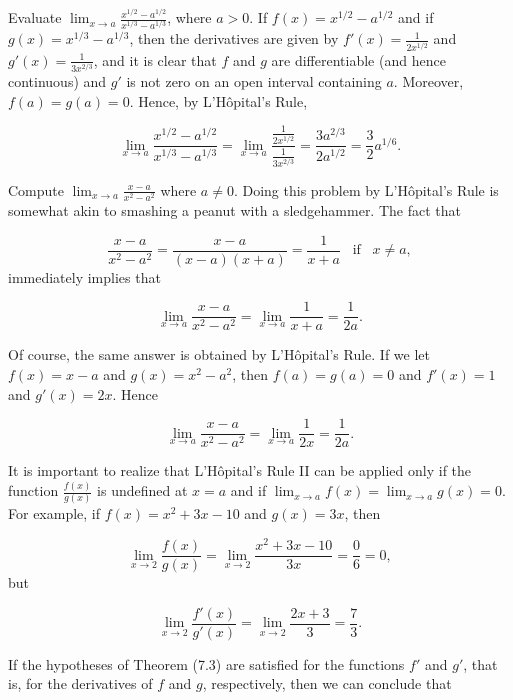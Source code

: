 \begin{example}
Evaluate $\lim_{x \rightarrow a}\frac{x^{1/2} - a^{1/2}}{x^{1/3} - a^{1/3}}$, where $a > 0$. If $f(x) = x^{1/2} - a^{1/2}$ and if $g(x) = x^{1/3} - a^{1/3}$, then the derivatives are given by $f' (x) = \frac{1}{2x^{1/2}}$ and $g'(x) = \frac{1}{3x^{2/3}}$, and it is clear that $f$ and $g$ are differentiable (and hence continuous) and $g'$ is not zero on an open interval containing $a$.  Moreover,
$f(a) = g(a) = 0$. Hence, by L'H\^{o}pital's Rule,

$$
\lim_{x \rightarrow a}\frac{x^{1/2} - a^{1/2}}{x^{1/3} -a^{1/3}} 
= \lim_{x \rightarrow a} \frac {\frac{1}{2x^{1/2}}}{\frac{1}{3x^{2/3}}} = \frac{3a^{2/3}}{2a^{1/2}} = \frac{3}{2} a^{1/6}.
$$
\end{example}
\medskip

\begin{example}
Compute $\lim_{x \rightarrow a}\frac{x - a}{x^2 - a^2}$ where $a \neq 0 $. Doing this problem by L'H\^{o}pital's Rule is somewhat akin to smashing a peanut with a sledgehammer. The fact that

$$
\frac{x - a}{x^2 - a^2} = \frac{x - a}{(x - a)(x + a)} = \frac{1}{x + a}  \;\;\; \mbox{if} \;\;\; x \neq a,
$$
\noindent immediately implies that 

$$\lim_{x \rightarrow a}\frac{x - a}{x^2 - a^2}  = \lim_{x \rightarrow a} \frac{1}{x + a} = \frac{1}{2a}.
$$

\noindent Of course, the same answer is obtained by L'H\^{o}pital's Rule. If we let $f(x) = x - a$ and $g(x) = x^2 - a^2$, then $f(a) = g(a) = 0$ and $f'(x) = 1$ and $g'(x) = 2x$. Hence

$$
\lim_{x \rightarrow a} \frac{x - a}{x^2 - a^2} = \lim_{x \rightarrow a}\frac{1}{2x} = \frac{1}{2a}.
$$
\end{example}

It is important to realize that L'H\^{o}pital's Rule II can be applied only if the function $\frac{f(x)}{g(x)}$ is undefined at $x = a$ and if $\lim_{x \rightarrow a}f(x) = \lim_{x \rightarrow a} g(x) = 0.$  For example, if $f(x) = x^2 + 3x - 10$ and $g(x) = 3x$, then 

$$
\lim_{x \rightarrow 2} \frac{f(x)}{g(x)} = \lim_{x \rightarrow 2}\frac{x^2 + 3x -10}{3x} = \frac{0}{6} = 0,
$$
\noindent but 

$$
\lim_{x \rightarrow 2}\frac{f'(x)}{g'(x)} = \lim_{x \rightarrow 2} \frac{2x + 3}{3} = \frac{7}{3}.
$$

If the hypotheses of Theorem (7.3) are satisfied for the functions $f'$ and $g'$, that is, for the derivatives of $f$ and $g$, respectively, then we can conclude that

